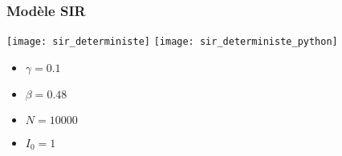 \begin{frame}
        \frametitle{Modèle SIR}
			
		\centering

		\texttt{[image: sir\_deterministe]}
		\texttt{[image: sir\_deterministe\_python]}
	
		
        \begin{multicols}{2}
                \begin{itemize}
                        \item $\gamma = 0.1$
                        \item $\beta = 0.48$
                        \item $N = 10000$
                        \item $I_0 = 1$
                \end{itemize}
        \end{multicols}

\end{frame}


